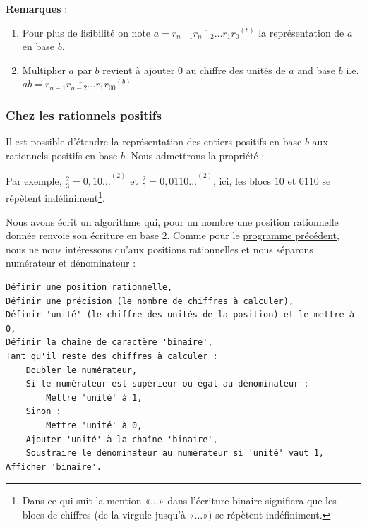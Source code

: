 \documentclass[a4paper,french,12pt]{article}
\begin{document}
\textbf{Remarques} : 
\begin{enumerate}
\item Pour plus de lisibilité on note $a=\overline{r_{n-1}r_{n-2}\ldots r_1r_0}^{\left(b\right)}$ la représentation de $a$ en base $b$.
\item Multiplier $a$ par $b$ revient à ajouter $0$ au chiffre des unités de $a$ and base $b$ i.e. $ab=\overline{r_{n-1}r_{n-2}\ldots r_1r_00}^{\left(b\right)}$.
\end{enumerate}

\subsubsection{Chez les rationnels positifs}
Il est possible d'étendre la représentation des entiers positifs en base $b$ aux rationnels positifs en base $b$. Nous admettrons la propriété :

\hypertarget{5}{}

Par exemple, $\frac{2}{3}=\overline{0{,}10\ldots}^{\left(2\right)}$ et $\frac{2}{5}=\overline{0{,}0110\ldots}^{\left(2\right)}$, ici, les blocs $10$ et $0110$ se répètent indéfiniment\footnote{Dans ce qui suit la mention «$\ldots$» dans l'écriture binaire signifiera que les blocs de chiffres (de la virgule jusqu'à «$\ldots$») se répètent indéfiniment.}. 

Nous avons écrit un algorithme qui, pour un nombre une position rationnelle donnée renvoie son écriture en base $2$. Comme pour le \hyperlink{6}{programme précédent}, nous ne nous intéressons qu'aux positions rationnelles et nous séparons numérateur et dénominateur :

\begin{center}
\begin{verbatim}
Définir une position rationnelle,
Définir une précision (le nombre de chiffres à calculer),
Définir 'unité' (le chiffre des unités de la position) et le mettre à 0,
Définir la chaîne de caractère 'binaire',
Tant qu'il reste des chiffres à calculer :
    Doubler le numérateur,
    Si le numérateur est supérieur ou égal au dénominateur : 
        Mettre 'unité' à 1,
    Sinon :
        Mettre 'unité' à 0,
    Ajouter 'unité' à la chaîne 'binaire',
    Soustraire le dénominateur au numérateur si 'unité' vaut 1,
Afficher 'binaire'.
\end{verbatim}
\end{center}
\end{document}
